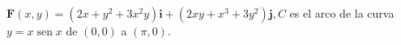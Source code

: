 \item $\mathbf{F}(x, y) = (2x + y^2 + 3x^2y)\mathbf{i} + (2xy + x^3 + 3y^2)\mathbf{j}, C$ es el arco de la curva $y = x \operatorname{sen} x$ de $(0, 0)$ a $(\pi, 0)$.
